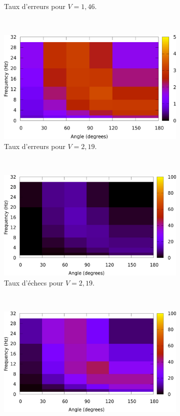 \begin{figure}[!htb]
\begin{subfigure}[t]{\subImgWlineplot}
			\caption{Taux d'erreurs pour $V = 1,46$.}
			\label{fig:hmap_e_146}
		\end{subfigure}
		~
		\begin{subfigure}[t]{\subImgWlineplot}
			\centering
			\includegraphics[width=\textwidth]{figures/ch4/average_error_rates_081}
			\caption{Taux d'erreurs pour $V = 2,19$.}
			\label{fig:hmap_e_219}
		\end{subfigure}
		~
		\begin{subfigure}[t]{\subImgWlineplot}
			\centering
			\includegraphics[width=\textwidth]{figures/ch4/average_failure_rates_054}
			\caption{Taux d'échecs pour $V = 2,19$.}
			\label{fig:hmap_f_146}
		\end{subfigure}
		~
		\begin{subfigure}[t]{\subImgWlineplot}
			\centering
			\includegraphics[width=\textwidth]{figures/ch4/average_failure_rates_081}

\end{subfigure}
\end{figure}
